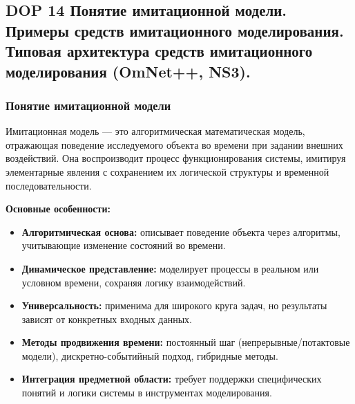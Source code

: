 \subsection*{DOP 14 Понятие имитационной модели. Примеры средств имитационного моделирования.
Типовая архитектура средств имитационного моделирования (OmNet++, NS3).}

\subsubsection*{Понятие имитационной модели}
Имитационная модель — это алгоритмическая математическая модель, отражающая
поведение исследуемого объекта во времени при задании внешних воздействий.
Она воспроизводит процесс функционирования системы,
имитируя элементарные явления с сохранением их логической структуры и временной последовательности.

\textbf{Основные особенности:}
\begin{itemize}
    \item \textbf{Алгоритмическая основа:}
		описывает поведение объекта через алгоритмы,
		учитывающие изменение состояний во времени.
    \item \textbf{Динамическое представление:}
		моделирует процессы в реальном или условном времени,
		сохраняя логику взаимодействий.
    \item \textbf{Универсальность:}
		применима для широкого круга задач,
		но результаты зависят от конкретных входных данных.
    \item \textbf{Методы продвижения времени:}
		постоянный шаг (непрерывные/потактовые модели),
		дискретно-событийный подход, гибридные методы.
    \item \textbf{Интеграция предметной области:}
		требует поддержки специфических понятий и логики системы
		в инструментах моделирования.
\end{itemize}

